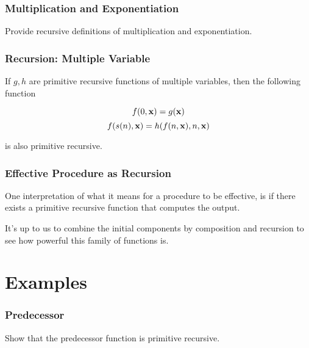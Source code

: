 \documentclass{beamer}
\begin{document}
\begin{frame}
	\frametitle{Multiplication and Exponentiation}

	Provide recursive definitions of multiplication and exponentiation.

	\vspace{7cm}
	
\end{frame}

\begin{frame}
	\frametitle{Recursion: Multiple Variable}

	If $g,h$ are primitive recursive functions of multiple variables, then the following function 

	$$f(0,{\bf x}) = g({\bf x})$$
	$$f(s(n),{\bf x}) = h(f(n,{\bf x}),n,{\bf x})$$

	is also primitive recursive. 


	\vspace{5cm}

\end{frame}

\begin{frame}
	\frametitle{Effective Procedure as Recursion}

	One interpretation of what it means for a procedure to be effective, is if there exists a primitive recursive function that computes the output.

	\vspace{0.5cm}

	It's up to us to combine the initial components by composition and recursion to see how powerful this family of functions is. 

	\vspace{5cm}

\end{frame}

\section{Examples}

\begin{frame}
	\frametitle{Predecessor}

	Show that the predecessor function is primitive recursive.

	\vspace{7cm}


\end{frame}
\end{document}
